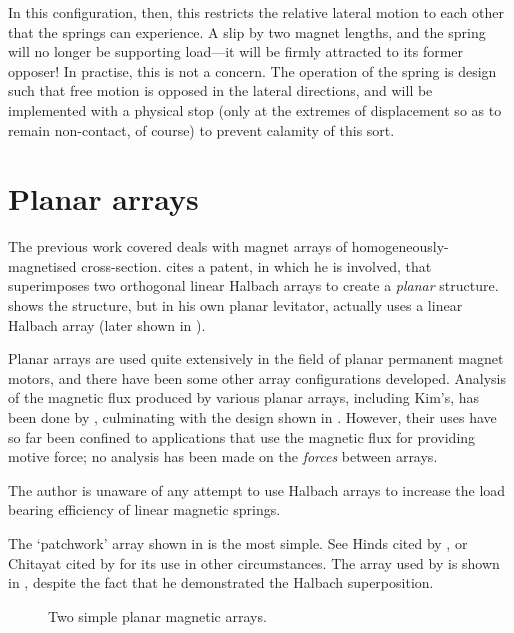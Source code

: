 In this configuration, then, this restricts the relative lateral motion to
each other that the springs can experience. A slip by two magnet lengths, and
the spring will no longer be supporting load---it will be firmly attracted to
its former opposer! In practise, this is not a concern. The operation of the
spring is design such that free motion is opposed in the lateral directions,
and will be implemented with a physical stop (only at the extremes of
displacement so as to remain non-contact, of course) to prevent calamity of
this sort.

\section{Planar arrays}

The previous work covered deals with magnet arrays of homogeneously-magnetised
cross-section. \textcite{kim1997} cites a patent, in which he is involved,
that superimposes two orthogonal linear Halbach arrays to create a
\emph{planar} structure.  shows the structure, but in his
own planar levitator, \citeauthor{kim1997} actually uses a linear Halbach
array (later shown in ).

Planar arrays are used quite extensively in the field of planar permanent
magnet motors, and there have been some other array configurations developed.
Analysis of the magnetic flux produced by various planar arrays, including
Kim's, has been done by \textcite{cho2001}, culminating with the
design shown in . However, their uses have so far
been confined to applications that use the magnetic flux for providing motive
force; no analysis has been made on the \emph{forces} between arrays.

The author is unaware of any attempt to use Halbach arrays to increase the
load bearing efficiency of linear magnetic springs.

The `patchwork' array shown in  is the most simple. See Hinds
cited by \textcite{kim1997}, or Chitayat cited by \textcite{cho2001} for its
use in other circumstances. The array used by \citeauthor{kim1997} is shown in
, despite the fact that he demonstrated the Halbach
superposition. 

\begin{figure}
  \hfil
  \caption{Two simple planar magnetic arrays.}
\end{figure}

